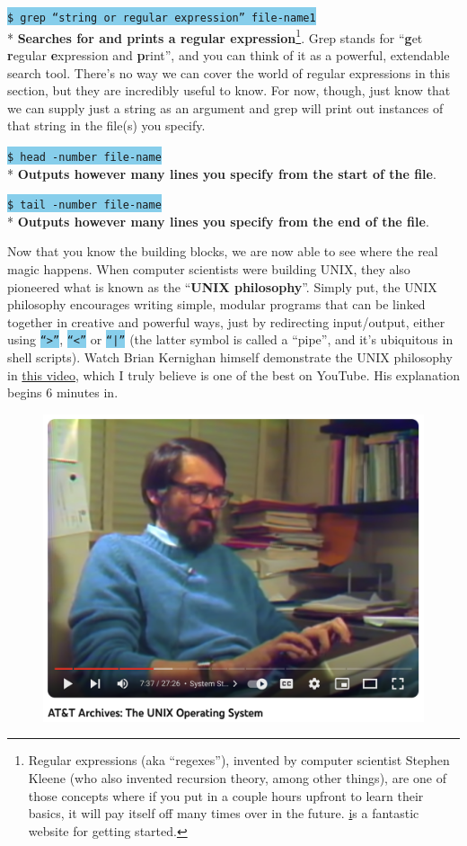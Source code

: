 \documentclass[fontsize=12pt,twoside=on,openright,parskip=half]{scrbook}
\newcommand{\code}[1]{\colorbox{skyblue}{\texttt{#1}}}
\begin{document}
\code{\$ grep ``string or regular expression'' file-name1} \\*
\textbf{Searches for and prints a regular expression}\footnote{Regular
	expressions (aka ``regexes''), invented by computer scientist Stephen
	Kleene (who also invented recursion theory, among other things), are one of
	those concepts where if you put in a couple hours upfront to learn their
	basics, it will pay itself off many times over in the future.
\href{https://regexone.com/} is a fantastic website for getting started. }.
Grep stands for ``\textbf{g}et \textbf{r}egular \textbf{e}xpression and
\textbf{p}rint'', and you can think of it as a powerful, extendable search
tool. There’s no way we can cover the world of regular expressions in this
section, but they are incredibly useful to know. For now, though, just know
that we can supply just a string as an argument and grep will print out
instances of that string in the file(s) you specify.

\code{\$ head -number file-name} \\*
\textbf{Outputs however many lines you specify from the start of the file}.

\code{\$ tail -number file-name} \\*
\textbf{Outputs however many lines you specify from the end of the file}.

Now that you know the building blocks, we are now able to see where the real
magic happens. When computer scientists were building UNIX, they also pioneered
what is known as the “\textbf{UNIX philosophy}”. Simply put, the UNIX
philosophy encourages writing simple, modular programs that can be linked
together in creative and powerful ways, just by redirecting input/output,
either using \code{``>''}, \code{``<''} or \code{``|''} (the latter symbol is
called a “pipe”, and it’s ubiquitous in shell scripts). Watch Brian Kernighan
himself demonstrate the UNIX philosophy in
\href{https://www.youtube.com/watch?v=tc4ROCJYbm0}{this video}, which I truly
believe is one of the best on YouTube. His explanation begins 6 minutes in.

\begin{figure}[h]
\centering
\includegraphics[scale=0.5]{unixprogrammer}
\end{figure}
\end{document}

